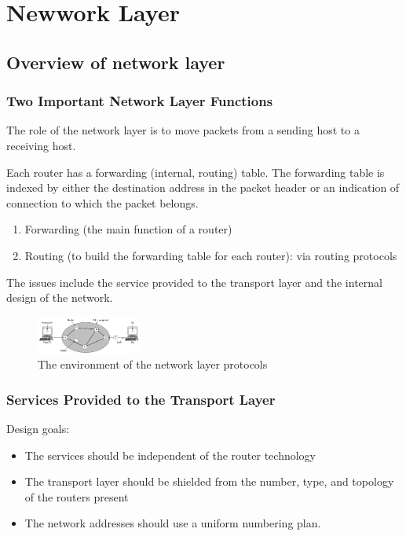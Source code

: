 \newpage
\section{Newwork Layer}
\subsection{Overview of network layer}

\subsubsection{Two Important Network Layer Functions}
The role of the network layer is to move packets from a sending host to a receiving host.

Each router has a forwarding (internal, routing) table. The forwarding table is indexed by either the destination address in the packet header or an indication of connection to which the packet belongs. 

\begin{enumerate}
    \item Forwarding (the main function of a router)
    \item Routing (to build the forwarding table for each router): via routing protocols
\end{enumerate}

The issues include the service provided to the transport layer and the internal design of the network.
\begin{figure}[!htb]
    \centering
    \includegraphics[width=0.309\textwidth]{pic/CN5/The environment of the network layer protocols}
    \caption{The environment of the network layer protocols}
\end{figure}

\subsubsection{Services Provided to the Transport Layer}
Design goals:
\begin{itemize}
    \item The services should be independent of the router technology
    \item The transport layer should be shielded from the number, type, and topology of the routers present
    \item The network addresses should use a uniform numbering plan.
\end{itemize}

